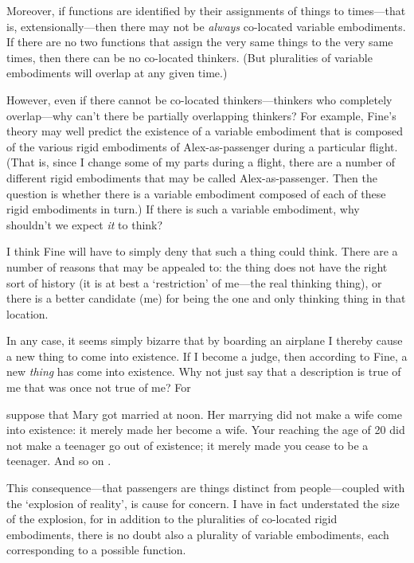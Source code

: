 \documentclass[11pt]{article}
\newenvironment{squote}{%
\begin{spacing}{1}
\begin{list}{}{%
\setlength{\labelwidth}{0pt}%
\rightmargin\leftmargin%
}
\item\relax
}{%
\end{list}%
\end{spacing}
}
\begin{document}
\begin{spacing}{1.5}
Moreover, if functions are identified by their assignments of things
to times---that is, extensionally---then there may not be {\em always}
co-located variable embodiments.  If there are no two functions that
assign the very same things to the very same times, then there can be
no co-located thinkers.  (But pluralities of variable embodiments will
overlap at any given time.)

However, even if there cannot be co-located thinkers---thinkers who
completely overlap---why can't there be partially overlapping
thinkers?  For example, Fine's theory may well predict the existence
of a variable embodiment that is composed of the various rigid
embodiments of Alex-as-passenger during a particular flight.  (That
is, since I change some of my parts during a flight, there are a
number of different rigid embodiments that may be called
Alex-as-passenger.  Then the question is whether there is a variable
embodiment composed of each of these rigid embodiments in turn.)  If
there is such a variable embodiment, why shouldn't we expect {\em it}
to think?

I think Fine will have to simply deny that such a thing could think.
There are a number of reasons that may be appealed to: the thing does
not have the right sort of history (it is at best a `restriction' of
me---the real thinking thing), or there is a better candidate (me) for
being the one and only thinking thing in that location.

In any case, it seems simply bizarre that by boarding an airplane I
thereby cause a new thing to come into existence.  If I become a
judge, then according to Fine, a new {\em thing} has come into
existence.  Why not just say that a description is true of me that was
once not true of me?  For

\begin{squote}
suppose that Mary got married at noon.  Her marrying did not make a
wife come into existence: it merely made her become a wife.  Your
reaching the age of 20 did not make a teenager go out of existence; it
merely made you cease to be a teenager.  And so on
\citep[151]{thomson1998a}.
\end{squote}

This consequence---that passengers are things distinct from
people---coupled with the `explosion of reality', is cause for
concern.  I have in fact understated the size of the explosion, for in
addition to the pluralities of co-located rigid embodiments, there is
no doubt also a plurality of variable embodiments, each corresponding
to a possible function.


\end{spacing}
\end{document}
